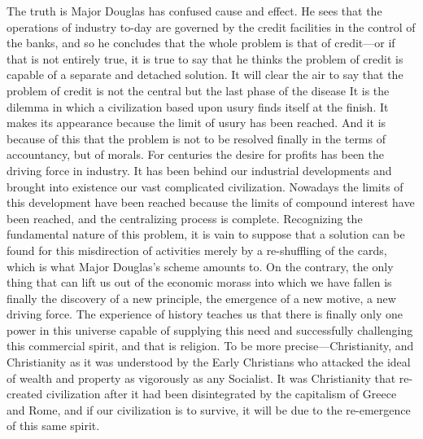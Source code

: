 \documentclass{book}
\begin{document}
The truth is Major Douglas has confused cause and effect. He sees that the operations of industry to-day are governed by the credit facilities in the control of the banks, and so he concludes that the whole problem is that of credit—or if that is not entirely true, it is true to say that he thinks the problem of credit is capable of a separate and detached solution. It will clear the air to say that the problem of credit is not the central but the last phase of the disease It is the dilemma in which a civilization based upon usury finds itself at the finish. It makes its appearance because the limit of usury has been reached. And it is because of this that the problem is not to be resolved finally in the terms of accountancy, but of morals. For centuries the desire for profits has been the driving force in industry. It has been behind our industrial developments and brought into existence our vast complicated civilization. Nowadays the limits of this development have been reached because the limits of compound interest have been reached, and the centralizing process is complete. Recognizing the fundamental nature of this problem, it is vain to suppose that a solution can be found for this misdirection of activities merely by a re-shuffling of the cards, which is what Major Douglas’s scheme amounts to. On the contrary, the only thing that can lift us out of the economic morass into which we have fallen is finally the discovery of a new principle, the emergence of a new motive, a new driving force. The experience of history teaches us that there is finally only one power in this universe capable of supplying this need and successfully challenging this commercial spirit, and that is religion. To be more precise—Christianity, and Christianity as it was understood by the Early Christians who attacked the ideal of wealth and property as vigorously as any Socialist. It was Christianity that re-created civilization after it had been disintegrated by the capitalism of Greece and Rome, and if our civilization is to survive, it will be due to the re-emergence of this same spirit.
\end{document}
